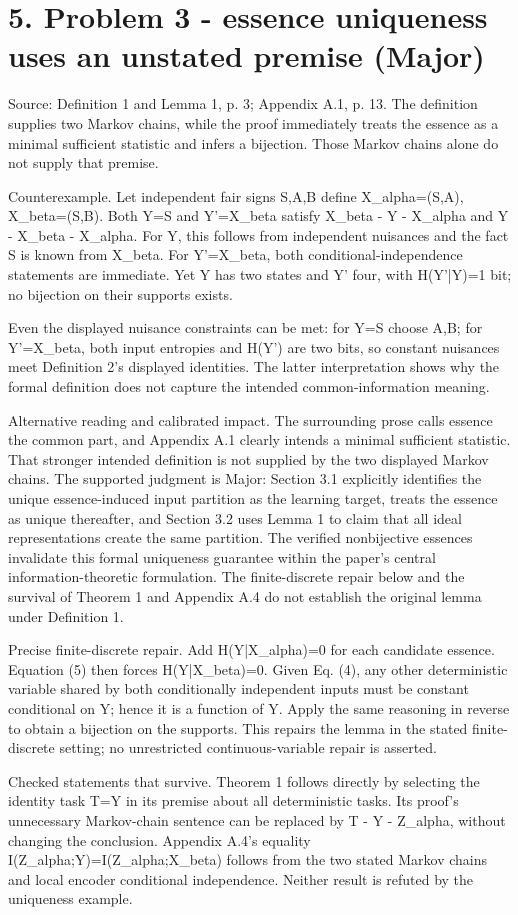 \documentclass[10pt]{article}
\begin{document}
\section*{5. Problem 3 - essence uniqueness uses an unstated premise (Major)}
Source: Definition 1 and Lemma 1, p. 3; Appendix A.1, p. 13. The definition supplies two Markov chains, while the proof immediately treats the essence as a minimal sufficient statistic and infers a bijection. Those Markov chains alone do not supply that premise.\par
Counterexample. Let independent fair signs S,A,B define X\_alpha=(S,A), X\_beta=(S,B). Both Y=S and Y’=X\_beta satisfy X\_beta - Y - X\_alpha and Y - X\_beta - X\_alpha. For Y, this follows from independent nuisances and the fact S is known from X\_beta. For Y’=X\_beta, both conditional-independence statements are immediate. Yet Y has two states and Y’ four, with H(Y’|Y)=1 bit; no bijection on their supports exists.\par
Even the displayed nuisance constraints can be met: for Y=S choose A,B; for Y’=X\_beta, both input entropies and H(Y’) are two bits, so constant nuisances meet Definition 2’s displayed identities. The latter interpretation shows why the formal definition does not capture the intended common-information meaning.\par
Alternative reading and calibrated impact. The surrounding prose calls essence the common part, and Appendix A.1 clearly intends a minimal sufficient statistic. That stronger intended definition is not supplied by the two displayed Markov chains. The supported judgment is Major: Section 3.1 explicitly identifies the unique essence-induced input partition as the learning target, treats the essence as unique thereafter, and Section 3.2 uses Lemma 1 to claim that all ideal representations create the same partition. The verified nonbijective essences invalidate this formal uniqueness guarantee within the paper’s central information-theoretic formulation. The finite-discrete repair below and the survival of Theorem 1 and Appendix A.4 do not establish the original lemma under Definition 1.\par
Precise finite-discrete repair. Add H(Y|X\_alpha)=0 for each candidate essence. Equation (5) then forces H(Y|X\_beta)=0. Given Eq. (4), any other deterministic variable shared by both conditionally independent inputs must be constant conditional on Y; hence it is a function of Y. Apply the same reasoning in reverse to obtain a bijection on the supports. This repairs the lemma in the stated finite-discrete setting; no unrestricted continuous-variable repair is asserted.\par
Checked statements that survive. Theorem 1 follows directly by selecting the identity task T=Y in its premise about all deterministic tasks. Its proof’s unnecessary Markov-chain sentence can be replaced by T - Y - Z\_alpha, without changing the conclusion. Appendix A.4’s equality I(Z\_alpha;Y)=I(Z\_alpha;X\_beta) follows from the two stated Markov chains and local encoder conditional independence. Neither result is refuted by the uniqueness example.\par
\end{document}
